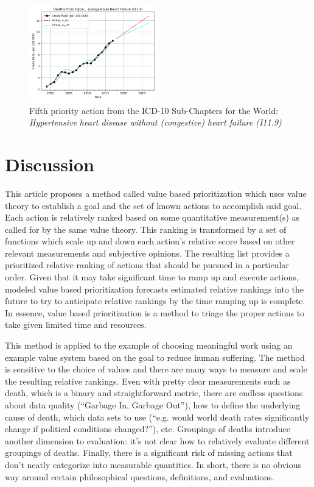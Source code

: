 \documentclass[10pt, a4paper, twocolumn]{IEEEconf}
\begin{document}
\begin{figure}[H]
  \centering
  \includegraphics[width=0.5\textwidth]{results/US_ICD10_MINIMALLY_GROUPED/Hypertensive_heart_disease_without_congestive_heart_failure_I11_9_ets.png}
  \caption{Fifth priority action from the ICD-10 Sub-Chapters for the World: \textit{Hypertensive heart disease without (congestive) heart failure (I11.9)}}\label{fig:k12e}
\end{figure}

\clearpage

\section{Discussion}

This article proposes a method called value based prioritization which uses value theory to establish a goal and the set of known actions to accomplish said goal.
Each action is relatively ranked based on some quantitative measurement(s) as called for by the same value theory.
This ranking is transformed by a set of functions which scale up and down each action's relative score based on other relevant measurements and subjective opinions.
The resulting list provides a prioritized relative ranking of actions that should be pursued in a particular order.
Given that it may take significant time to ramp up and execute actions, modeled value based prioritization forecasts estimated relative rankings into the future to try to anticipate relative rankings by the time ramping up is complete.
In essence, value based prioritization is a method to triage the proper actions to take given limited time and resources.

This method is applied to the example of choosing meaningful work using an example value system based on the goal to reduce human suffering.
The method is sensitive to the choice of values and there are many ways to measure and scale the resulting relative rankings.
Even with pretty clear measurements such as death, which is a binary and straightforward metric, there are endless questions about data quality (\enquote{Garbage In, Garbage Out}), how to define the underlying cause of death, which data sets to use (\enquote{e.g. would world death rates significantly change if political conditions changed?}), etc.
Groupings of deaths introduce another dimension to evaluation: it's not clear how to relatively evaluate different groupings of deaths.
Finally, there is a significant risk of missing actions that don't neatly categorize into measurable quantities.
In short, there is no obvious way around certain philosophical questions, definitions, and evaluations.
\end{document}
